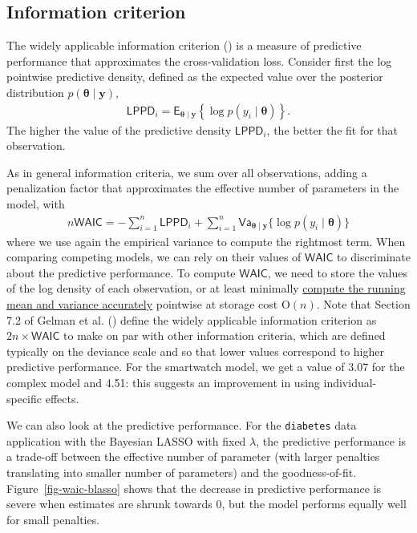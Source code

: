 \documentclass[
  11pt,
  letterpaper,
]{scrbook}
\theoremstyle{definition}
\theoremstyle{definition}
\theoremstyle{definition}
\theoremstyle{plain}
\theoremstyle{plain}
\theoremstyle{remark}
\begin{document}
\subsection{Information criterion}\label{information-criterion}

The widely applicable information criterion
() is a measure of predictive
performance that approximates the cross-validation loss. Consider first
the log pointwise predictive density, defined as the expected value over
the posterior distribution
\(p(\boldsymbol{\theta} \mid \boldsymbol{y})\), \begin{align*}
\mathsf{LPPD}_i = \mathsf{E}_{\boldsymbol{\theta} \mid \boldsymbol{y}} \left\{ \log p(y_i \mid \boldsymbol{\theta})\right\}.
\end{align*} The higher the value of the predictive density
\(\mathsf{LPPD}_i\), the better the fit for that observation.

As in general information criteria, we sum over all observations, adding
a penalization factor that approximates the effective number of
parameters in the model, with \begin{align*}
n\mathsf{WAIC} = -\sum_{i=1}^n \mathsf{LPPD}_i + \sum_{i=1}^n \mathsf{Va}_{\boldsymbol{\theta} \mid \boldsymbol{y}}\{\log p(y_i \mid \boldsymbol{\theta})\}
\end{align*} where we use again the empirical variance to compute the
rightmost term. When comparing competing models, we can rely on their
values of \(\mathsf{WAIC}\) to discriminate about the predictive
performance. To compute \(\mathsf{WAIC}\), we need to store the values
of the log density of each observation, or at least minimally
\href{https://www.johndcook.com/blog/standard_deviation/}{compute the
running mean and variance accurately} pointwise at storage cost
\(\mathrm{O}(n)\). Note that Section 7.2 of Gelman et al.
() define the widely applicable
information criterion as \(2n \times \mathsf{WAIC}\) to make on par with
other information criteria, which are defined typically on the deviance
scale and so that lower values correspond to higher predictive
performance. For the smartwatch model, we get a value of 3.07 for the
complex model and 4.51: this suggests an improvement in using
individual-specific effects.

We can also look at the predictive performance. For the
\texttt{diabetes} data application with the Bayesian LASSO with fixed
\(\lambda\), the predictive performance is a trade-off between the
effective number of parameter (with larger penalties translating into
smaller number of parameters) and the goodness-of-fit.
Figure~\ref{fig-waic-blasso} shows that the decrease in predictive
performance is severe when estimates are shrunk towards 0, but the model
performs equally well for small penalties.
\end{document}
